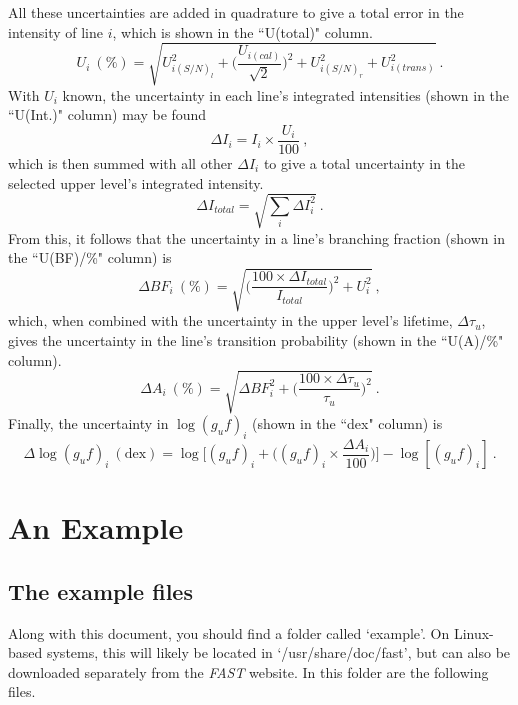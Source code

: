 \documentclass[a4paper,12pt]{report}
\newcommand{\fast}{\emph{FAST} }
\begin{document}
All these uncertainties are added in quadrature to give a total error in the intensity of line $i$, which is shown in the ``U(total)" column.
\begin{equation}
U_i~(\%) = \sqrt{U^2_{i(S/N)_l} + \Biggl(\frac{U_{i(cal)}}{\sqrt{2}}\Biggr)^2 + U^2_{i(S/N)_r} + U^2_{i(trans)}}~.
\end{equation}
With $U_i$ known, the uncertainty in each line's integrated intensities (shown in the ``U(Int.)" column) may be found
\begin{equation}
\Delta I_i = I_i\times \frac{U_i}{100}~,
\end{equation}
which is then summed with all other $\Delta I_i$ to give a total uncertainty in the selected upper level's integrated intensity.
\begin{equation}
\Delta I_{total} = \sqrt{\sum_i\Delta I^2_i}~.
\end{equation}
From this, it follows that the uncertainty in a line's branching fraction (shown in the ``U(BF)/\%" column) is
\begin{equation}
\Delta BF_i~(\%) = \sqrt{\Biggl(\frac{100\times\Delta I_{total}}{I_{total}}\Biggr)^2 + U_i^2}~,
\end{equation}
which, when combined with the uncertainty in the upper level's lifetime, $\Delta\tau_u$, gives the uncertainty in the line's transition probability (shown in the ``U(A)/\%" column).
\begin{equation}
\Delta A_i~(\%) = \sqrt{\Delta BF_i^2 + \Biggl(\frac{100\times \Delta\tau_u}{\tau_u}\Biggr)^2}~.
\end{equation}
Finally, the uncertainty in $\log (g_uf)_i$ (shown in the ``dex" column) is
\begin{equation}
\Delta\log (g_uf)_i~(\mbox{dex}) = \log\Biggl[(g_uf)_i + \Biggl((g_uf)_i \times \frac{\Delta A_i}{100}\Biggr)\Biggr] - \log[(g_uf)_i]~.
\end{equation}

\chapter{An Example}
\section{The example files}
Along with this document, you should find a folder called `example'. On Linux-based systems, this will likely be located in `/usr/share/doc/fast', but can also be downloaded separately from the \fast website. In this folder are the following files.
\end{document}
